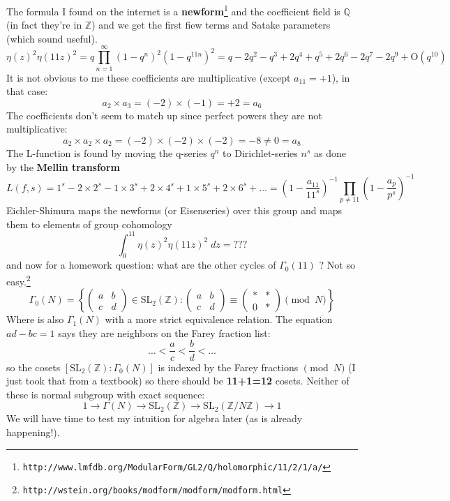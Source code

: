 \documentclass[12pt]{article}
\begin{document}
\newpage

\noindent The formula I found on the internet is a \textbf{newform}\footnote{\texttt{http://www.lmfdb.org/ModularForm/GL2/Q/holomorphic/11/2/1/a/}} and the coefficient field is $\mathbb{Q}$ (in fact they're in $\mathbb{Z}$) and we get the first fiew terms and Satake parameters (which sound useful). 
$$ \eta(z)^2 \eta(11z)^2 = q \prod_{n=1}^\infty (1-q^n)^2 (1 - q^{11n})^2  = q - 2q^2 - q^3 + 2q^4 + q^5 + 2 q^6 - 2 q^7 - 2q^9 + \text{O}(q^{10})$$
It is not obvious to me these coefficients are multiplicative (except $a_{11} = +1$), in that case:
$$ a_2 \times a_3 = (-2) \times (-1) = + 2 = a_6 $$
The coefficients don't seem to match up since perfect powers they are not multiplicative:
$$ a_2 \times a_2 \times a_2 = (-2)\times (-2)\times (-2) = -8 \neq 0 = a_8 $$
The L-function is found by moving the q-series $q^n$ to Dirichlet-series $n^s$ as done by the \textbf{Mellin transform}
$$ L(f,s) = 1^s -2 \times 2^s - 1 \times 3^s + 2 \times 4^s + 1 \times 5^s + 2 \times 6^s  + \dots = \left( 1 - \frac{a_{11}}{11^s} \right)^{-1} \prod_{p \neq 11} \left( 1 - \frac{a_p}{p^s} \right)^{-1} $$
Eichler-Shimura maps the newforms (or Eisenseries) over this group and maps them to elements of group cohomology
$$ \int_0^{11} \eta(z)^2 \eta(11z)^2 \; dz = \text{???} $$
and now for a homework question: what are the other cycles of $\Gamma_0(11)$ ? Not so easy.\footnote{\texttt{http://wstein.org/books/modform/modform/modform.html}}
$$ \Gamma_0(N) = \left\{ \left( \begin{array}{cc} a & b \\ c & d \end{array}   \right) \in \text{SL}_2(\mathbb{Z}) : 
\left( \begin{array}{cc} a & b \\ c & d \end{array}   \right)  \equiv
\left( \begin{array}{cc} \ast & \ast \\ 0 &  \ast  \end{array}  \right) \pmod{ N }
 \right\} $$
 Where is also $\Gamma_1(N)$ with a more strict equivalence relation.   The equation $ad-bc=1$ says they are neighbors on the Farey fraction list:
 $$ \dots  < \frac{a}{c} <  \frac{b}{d} < \dots $$
so the cosets $[\text{SL}_2(\mathbb{Z}) : \Gamma_0(N)]$ is indexed by the Farey fractions $\pmod {N}$ (I just took that from a textbook) so there should be \textbf{11+1=12} cosets.  Neither of these is normal subgroup with exact sequence:
$$ 1 \to \Gamma(N) \to \text{SL}_2(\mathbb{Z}) \to \text{SL}_2( \mathbb{Z}/N\mathbb{Z}) \to 1 $$
We will have time to test my intuition for algebra later (as is already happening!).
\end{document}
